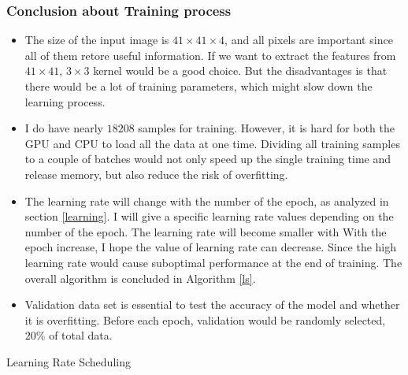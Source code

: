     \subsubsection{Conclusion about Training process}
    \begin{itemize}
        \item The size of the input image is $41\times41\times4$, and all pixels are important since all of them retore useful information. If we want to extract the features from $41\times 41$, $3\times 3$ kernel would be a good choice. But the disadvantages is that there would be a lot of training parameters, which might slow down the learning process.
        \item I do have nearly $18208$ samples for training. However, it is hard for both the GPU and CPU to load all the data at one time. Dividing all training samples to a couple of batches would not only speed up the single training time and release memory, but also reduce the risk of overfitting.
        \item The learning rate will change with the number of the epoch, as analyzed in section \ref{learning}. I will give a specific learning rate values depending on the number of the epoch. The learning rate will become smaller with With the epoch increase, I hope the value of learning rate can decrease. Since the high learning rate would cause suboptimal performance at the end of training. The overall algorithm is concluded in Algorithm \ref{ls}.
        \item Validation data set is essential to test the accuracy of the model and whether it is overfitting. Before each epoch, validation would be randomly selected, $20\%$ of total data.
    \end{itemize}

    \begin{algorithm}[!h]
        \caption{Learning Rate Scheduling}
        \label{ls}
    \end{algorithm}


